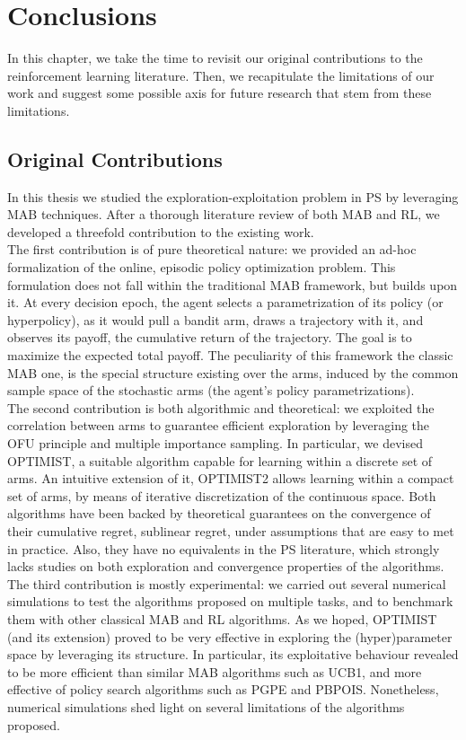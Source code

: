 
\chapter{Conclusions} \label{ch:conclusions}
In this chapter, we take the time to revisit our original contributions to the reinforcement learning literature. Then, we recapitulate the limitations of our work and suggest some possible
axis for future research that stem from these limitations.


\section{Original Contributions}
In this thesis we studied the exploration-exploitation problem in \gls{PS} by leveraging \gls{MAB} techniques. After a thorough literature review of both \gls{MAB} and \gls{RL}, we developed a threefold contribution to the existing work. \\
The first contribution is of pure theoretical nature: we provided an ad-hoc formalization of the online, episodic policy optimization problem. This formulation does not fall within the traditional \gls{MAB} framework, but builds upon it. At every decision epoch, the agent selects a parametrization of its policy (or hyperpolicy), as it would pull a bandit arm, draws a trajectory with it, and observes its payoff, \ie the cumulative return of the trajectory. The goal is to maximize the expected total payoff. The peculiarity of this framework \wrt the classic \gls{MAB} one, is the special structure existing over the arms, induced by the common sample space of the stochastic arms (the agent's policy parametrizations). \\
The second contribution is both algorithmic and theoretical: we exploited the correlation between arms to guarantee efficient exploration by leveraging the \gls{OFU} principle and multiple importance sampling. In particular, we devised \gls{OPTIMIST}, a suitable algorithm capable for learning within a discrete set of arms. An intuitive extension of it, \gls{OPTIMIST}2 allows learning within a compact set of arms, by means of iterative discretization of the continuous space. Both algorithms have been backed by theoretical guarantees on the convergence of their cumulative regret, \ie sublinear regret, under assumptions that are easy to met in practice. Also, they have no equivalents in the \gls{PS} literature, which strongly lacks studies on both exploration and convergence properties of the algorithms. \\
The third contribution is mostly experimental: we carried out several numerical simulations to test the algorithms proposed on multiple tasks, and to benchmark them with other classical \gls{MAB} and \gls{RL} algorithms. As we hoped, \gls{OPTIMIST} (and its extension) proved to be very effective in exploring the (hyper)parameter space by leveraging its structure. In particular, its exploitative behaviour revealed to be more efficient than similar \gls{MAB} algorithms such as \gls{UCB}1, and more effective of policy search algorithms such as \gls{PGPE} and \gls{PBPOIS}. Nonetheless, numerical simulations shed light on several limitations of the algorithms proposed.

